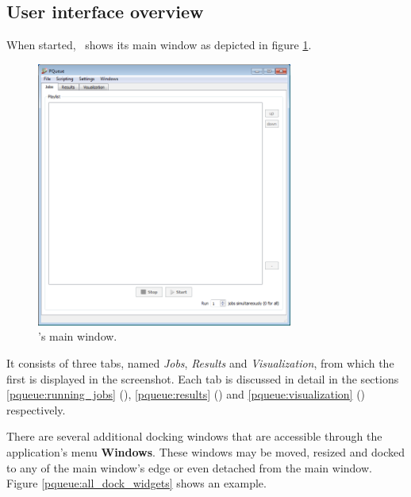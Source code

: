 \subsection{User interface overview}
	When started, \PQUEUE\ shows its main window
	as depicted in figure \ref{pqueue:main_window}.

	\begin{figure}[!ht]
	\centering
	\includegraphics[width=0.75\textwidth]{Screenshots/PQueue/main_window.png}
	\caption{\PQUEUE's main window.}
	\label{pqueue:main_window}
	\end{figure}

	It consists of three tabs, named \textit{Jobs}, \textit{Results} and \textit{Visualization},
	from which the first is displayed in the screenshot.
	Each tab is discussed in detail in the sections \ref{pqueue:running_jobs} (),
	\ref{pqueue:results} () and
	\ref{pqueue:visualization} () respectively.

	There are several additional docking windows that are accessible through the application's menu \textbf{Windows}.
	These windows may be moved, resized and docked to any of the main window's edge
	or even detached from the main window.
	Figure \ref{pqueue:all_dock_widgets} shows an example.


